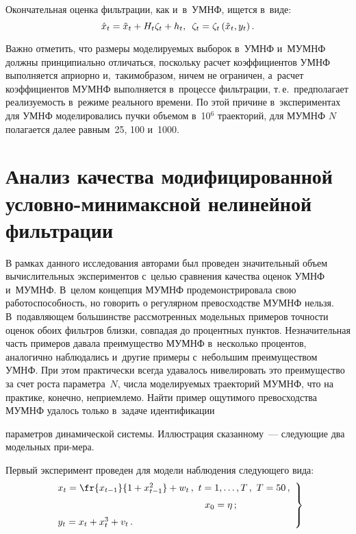 \begin{multicols}{2}
 Окончательная оценка фильт\-ра\-ции, 
как и~в~УМНФ, ищется в~виде:
$$
\hat{x}_t= \tilde{x}_t+ H_t 
\zeta_t+h_t,\enskip \zeta_t= \zeta_t\left(\tilde{x}_t, y_t\right). 
$$
    
    Важно отметить, что размеры моделируемых выбо\-рок в~УМНФ и~МУМНФ 
должны принципиально отличаться, поскольку расчет коэффициентов УМНФ 
выполняется априорно и,~таким\linebreak образом, ничем не ограничен, а~расчет 
коэффициентов МУМНФ выполняется в~процессе фильт\-ра\-ции, т.\,е.\ 
предполагает реализуемость в~режиме реального времени. По этой причине 
в~экспериментах для УМНФ моделировались пучки объемом в~10$^6$ 
траекторий, для МУМНФ $N$ полагается далее равным~25, 100 и~1000.
    
\section{Анализ качества модифицированной условно-минимаксной нелинейной
фильтрации}

    В рамках данного исследования авторами был проведен значительный 
объем вычислительных экспериментов с~целью сравнения качества оценок 
УМНФ и~МУМНФ. В~целом концепция МУМНФ продемонстрировала свою 
работоспособность, но говорить о регулярном превосходстве МУМНФ нель\-зя. 
В~подавляющем большинстве рассмотренных модельных примеров точности 
оценок обоих фильтров близки, совпадая до процентных пунктов. 
Незначительная часть примеров давала преимущество МУМНФ в~несколько 
процентов, аналогично наблюдались и~другие примеры с~небольшим 
преимуществом УМНФ. При этом практически всегда удавалось нивелировать 
это преимущество за счет роста параметра~$N$, числа моделируемых 
траекторий МУМНФ, что на практике, конечно, неприемлемо. Найти пример 
ощутимого превосходства МУМНФ удалось только в~задаче идентификации\linebreak\vspace*{-12pt}

\columnbreak

\noindent 
параметров динамической системы. Иллюстрация сказанному~--- следующие 
два модельных при-\linebreak мера.

    
    Первый эксперимент проведен для модели наблюдения следующего вида:
    \begin{equation}
    \left.
    \begin{array}{l}
    x_t=\fr{x_{t-1}}{1+x^2_{t-1}}+w_t\,,\ t=1,\ldots, T\,,\ T=50\,,\\[6pt] 
\hspace*{54mm}x_0=\eta\,;\\[6pt]
    y_t=x_t+x_t^3+v_t\,.
    \end{array}
    \right\}
    \label{e13-bos}
    \end{equation}
    

\end{multicols}
